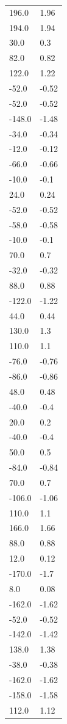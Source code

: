 \begin{longtable}{ll}
196.0 & 1.96 \\
194.0 & 1.94 \\
30.0 & 0.3 \\
82.0 & 0.82 \\
122.0 & 1.22 \\
-52.0 & -0.52 \\
-52.0 & -0.52 \\
-148.0 & -1.48 \\
-34.0 & -0.34 \\
-12.0 & -0.12 \\
-66.0 & -0.66 \\
-10.0 & -0.1 \\
24.0 & 0.24 \\
-52.0 & -0.52 \\
-58.0 & -0.58 \\
-10.0 & -0.1 \\
70.0 & 0.7 \\
-32.0 & -0.32 \\
88.0 & 0.88 \\
-122.0 & -1.22 \\
44.0 & 0.44 \\
130.0 & 1.3 \\
110.0 & 1.1 \\
-76.0 & -0.76 \\
-86.0 & -0.86 \\
48.0 & 0.48 \\
-40.0 & -0.4 \\
20.0 & 0.2 \\
-40.0 & -0.4 \\
50.0 & 0.5 \\
-84.0 & -0.84 \\
70.0 & 0.7 \\
-106.0 & -1.06 \\
110.0 & 1.1 \\
166.0 & 1.66 \\
88.0 & 0.88 \\
12.0 & 0.12 \\
-170.0 & -1.7 \\
8.0 & 0.08 \\
-162.0 & -1.62 \\
-52.0 & -0.52 \\
-142.0 & -1.42 \\
138.0 & 1.38 \\
-38.0 & -0.38 \\
-162.0 & -1.62 \\
-158.0 & -1.58 \\
112.0 & 1.12 \\

\end{longtable}
